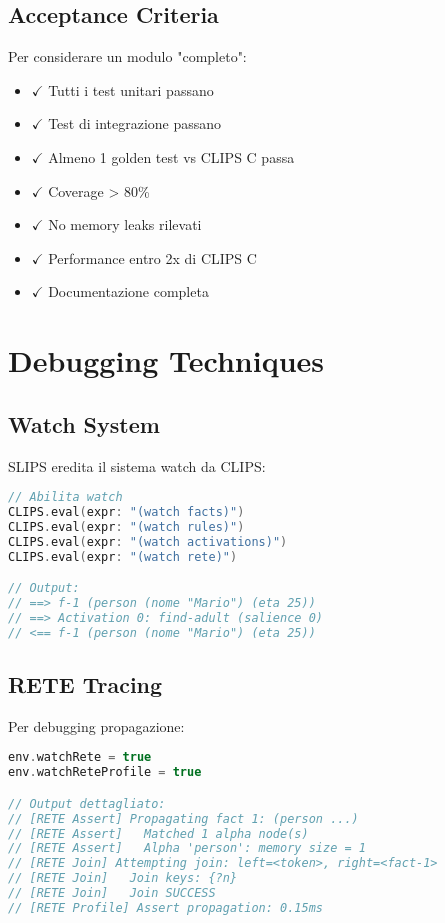\subsection{Acceptance Criteria}

Per considerare un modulo "completo":

\begin{itemize}
\item $\checkmark$ Tutti i test unitari passano
\item $\checkmark$ Test di integrazione passano
\item $\checkmark$ Almeno 1 golden test vs CLIPS C passa
\item $\checkmark$ Coverage > 80\%
\item $\checkmark$ No memory leaks rilevati
\item $\checkmark$ Performance entro 2x di CLIPS C
\item $\checkmark$ Documentazione completa
\end{itemize}

\section{Debugging Techniques}

\subsection{Watch System}

SLIPS eredita il sistema watch da CLIPS:

\begin{lstlisting}[language=Swift]
// Abilita watch
CLIPS.eval(expr: "(watch facts)")
CLIPS.eval(expr: "(watch rules)")
CLIPS.eval(expr: "(watch activations)")
CLIPS.eval(expr: "(watch rete)")

// Output:
// ==> f-1 (person (nome "Mario") (eta 25))
// ==> Activation 0: find-adult (salience 0)
// <== f-1 (person (nome "Mario") (eta 25))
\end{lstlisting}

\subsection{RETE Tracing}

Per debugging propagazione:

\begin{lstlisting}[language=Swift]
env.watchRete = true
env.watchReteProfile = true

// Output dettagliato:
// [RETE Assert] Propagating fact 1: (person ...)
// [RETE Assert]   Matched 1 alpha node(s)
// [RETE Assert]   Alpha 'person': memory size = 1
// [RETE Join] Attempting join: left=<token>, right=<fact-1>
// [RETE Join]   Join keys: {?n}
// [RETE Join]   Join SUCCESS
// [RETE Profile] Assert propagation: 0.15ms
\end{lstlisting}

